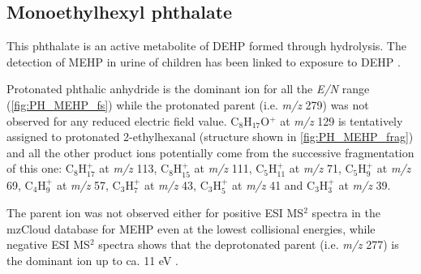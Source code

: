 \subsection{Monoethylhexyl phthalate}


This phthalate is an active metabolite of DEHP formed through hydrolysis. The detection of MEHP in urine of children has been linked to exposure to DEHP \cite{becker2004dehp}.


Protonated phthalic anhydride is the dominant ion for all the \textit{E/N} range (\autoref{fig:PH_MEHP_fs}) while the protonated parent (i.e. \textit{m/z} 279) was not observed for any reduced electric field value.
%
C$_8$H$_{17}$O$^+$ at \textit{m/z} 129 is tentatively assigned to protonated 2-ethylhexanal (structure shown in \autoref{fig:PH_MEHP_frag}) and all the other product ions potentially come from the successive fragmentation of this one:
C$_8$H$_{17}^+$ at \textit{m/z} 113,
C$_8$H$_{15}^+$ at \textit{m/z} 111,
C$_5$H$_{11}^+$ at \textit{m/z} 71,
C$_5$H$_9^+$ at \textit{m/z} 69,
C$_4$H$_9^+$ at \textit{m/z} 57,
C$_3$H$_7^+$ at \textit{m/z} 43,
C$_3$H$_5^+$ at \textit{m/z} 41
and
C$_3$H$_3^+$ at \textit{m/z} 39.

The parent ion was not observed either for positive ESI MS$^2$ spectra in the mzCloud database for MEHP even at the lowest collisional energies, while negative ESI MS$^2$ spectra shows that the deprotonated parent (i.e. \textit{m/z} 277) is the dominant ion up to ca. 11 eV \cite{mzcloudMEHP}.









